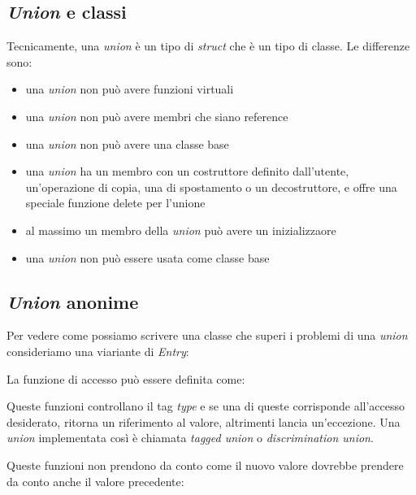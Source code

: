 \documentclass[11pt,a4paper]{book}
\begin{document}
\subsection{\emph{Union} e classi}
Tecnicamente, una \emph{union} è un tipo di \emph{struct} che è un tipo di classe. Le differenze sono:
\begin{itemize}
	\item una \emph{union} non può avere funzioni virtuali
	\item una \emph{union} non può avere membri che siano reference
	\item una \emph{union} non può avere una classe base
	\item una \emph{union} ha un membro con un costruttore definito dall'utente, un'operazione di copia, una di spostamento o un decostruttore, e offre una speciale funzione delete per l'unione
	\item al massimo un membro della \emph{union} può avere un inizializzaore
	\item una \emph{union} non può essere usata come classe base
\end{itemize}

\subsection{\emph{Union} anonime}
Per vedere come possiamo scrivere una classe che superi i problemi di una \emph{union} consideriamo una viariante di \emph{Entry}:
\label{code: 116}

La funzione di accesso può essere definita come:
\label{code: 117}

Queste funzioni controllano il tag \emph{type} e se una di queste corrisponde all'accesso desiderato, ritorna un riferimento al valore, altrimenti lancia un'eccezione. Una \emph{union} implementata così è chiamata \emph{tagged union} o \emph{discrimination union}.

Queste funzioni non prendono da conto come il nuovo valore dovrebbe prendere da conto anche il valore precedente:
\label{code: 118}
\end{document}
